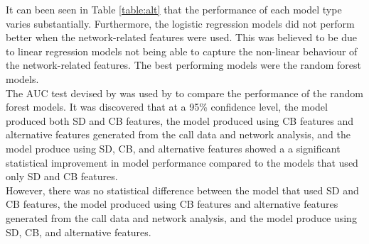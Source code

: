 \vspace{15pt}
 
 
It can been seen in Table \ref{table:alt} that the performance of each
model type varies substantially. Furthermore, the logistic
regression models did not perform better when the
network-related features were used. This was believed to be due to linear regression models not being able to capture the non-linear behaviour of the network-related features. The best performing models were the random forest models. \\

The AUC test devised by \textcite{AUC} was used by \textcite{BigDataMicroFiance} to compare the performance of the random forest models. It was discovered that at a 95\% confidence level, the model produced both SD and CB features, the model produced using CB features and alternative features generated from the call data and network analysis, and the model produce using SD, CB, and alternative features showed a a significant statistical improvement in model performance compared to the models that used only SD and CB features.\\

However, there was no statistical difference between the model that used  SD and CB features, the model produced using CB features and alternative features generated from the call data and network analysis, and the model produce using SD, CB, and alternative features. 
